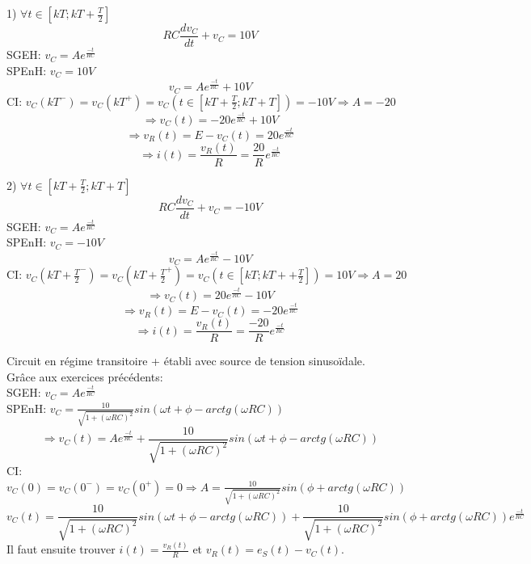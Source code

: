 {
1) $\forall t\in [kT;kT+\frac{T}{2}]$\\
$$RC\frac{dv_C}{dt}+v_C=10V$$
SGEH: $v_C=Ae^{\frac{-t}{RC}}$\\
SPEnH: $v_C=10V$
$$v_C=Ae^{\frac{-t}{RC}}+10V$$
CI: $v_C(kT^-)=v_C(kT^+)=v_C(t\in [kT+\frac{T}{2};kT+T])=-10V \Rightarrow A=-20$
$$\Rightarrow v_C(t)=-20e^{\frac{-t}{RC}}+10V$$
$$\Rightarrow v_R(t)=E-v_C(t)=20e^{\frac{-t}{RC}}$$
$$\Rightarrow i(t)=\frac{v_R(t)}{R}=\frac{20}{R}e^{\frac{-t}{RC}}$$

2) $\forall t\in [kT+\frac{T}{2};kT+T]$\\
$$RC\frac{dv_C}{dt}+v_C=-10V$$
SGEH: $v_C=Ae^{\frac{-t}{RC}}$\\
SPEnH: $v_C=-10V$
$$v_C=Ae^{\frac{-t}{RC}}-10V$$
CI: $v_C(kT+\frac{T}{2}^-)=v_C(kT+\frac{T}{2}^+)=v_C(t\in [kT;kT++\frac{T}{2}])=10V \Rightarrow A=20$
$$\Rightarrow v_C(t)=20e^{\frac{-t}{RC}}-10V$$
$$\Rightarrow v_R(t)=E-v_C(t)=-20e^{\frac{-t}{RC}}$$
$$\Rightarrow i(t)=\frac{v_R(t)}{R}=\frac{-20}{R}e^{\frac{-t}{RC}}$$
}

{ 
Circuit en régime transitoire + établi avec source de tension sinusoïdale.\\
Grâce aux exercices précédents:\\
SGEH: $v_C=Ae^{\frac{-t}{RC}}$\\
SPEnH: $v_C=\frac{10}{\sqrt{1+(\omega RC)^2}}sin(\omega t+\phi-arctg(\omega RC))$
$$\Rightarrow v_C(t)=Ae^{\frac{-t}{RC}}+\frac{10}{\sqrt{1+(\omega RC)^2}}sin(\omega t+\phi-arctg(\omega RC))$$
CI: $v_C(0)=v_C(0^-)=v_C(0^+)=0 \Rightarrow A=\frac{10}{\sqrt{1+(\omega RC)^2}}sin(\phi+arctg(\omega RC))$
$$v_C(t)=\frac{10}{\sqrt{1+(\omega RC)^2}}sin(\omega t+\phi-arctg(\omega RC))+\frac{10}{\sqrt{1+(\omega RC)^2}}sin(\phi+arctg(\omega RC))e^{\frac{-t}{RC}}$$
Il faut ensuite trouver $i(t)=\frac{v_R(t)}{R}$ et $v_R(t)=e_S(t)-v_C(t)$.
}


